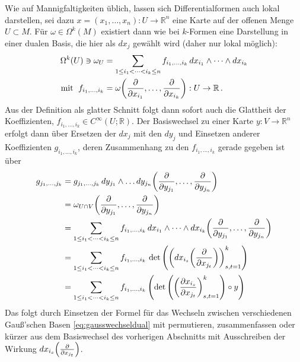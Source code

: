\documentclass[../H_Analysis_main.tex]{subfiles}
\begin{document}


Wie auf Mannigfaltigkeiten üblich, lassen sich Differentialformen auch lokal darstellen, sei dazu $x = (x_1, \dots, x_n): U \rightarrow \mathbb{R}^n$ eine Karte auf der offenen Menge $U \subset M$. Für $\omega \in \Omega^k(M)$ existiert dann wie bei $k$-Formen eine Darstellung in einer dualen Basis, die hier als $dx_j$ gewählt wird (daher nur lokal möglich):
\begin{equation}
\begin{split}
\Omega^k(U) \ni \omega_U &= \sum_{1 \leq i_1 < \dots < i_k \leq n} f_{i_1, \dots, i_k} \, dx_{i_1} \wedge \dots \wedge dx_{i_k}
\\
\text{mit } \; f_{i_1, \dots, i_k} &= \omega\qty(\pdv{x_{i_1}}, \dots, \pdv{x_{i_k}}): U \rightarrow \mathbb{R} \, .
\end{split}
\end{equation}
Aus der Definition als glatter Schnitt folgt dann sofort auch die Glattheit der Koeffizienten, $f_{i_1, \dots, i_k} \in C^\infty(U; \mathbb{R})$. Der Basiswechsel zu einer Karte $y: V \rightarrow \mathbb{R}^n$ erfolgt dann über Ersetzen der $dx_j$ mit den $dy_j$ und Einsetzen anderer Koeffizienten $g_{i_1, \dots, i_k}$, deren Zusammenhang zu den $f_{i_1, \dots, i_k}$ gerade gegeben ist über
\begin{align}
g_{j_1, \dots, j_k} &= g_{j_1, \dots, j_k} \, dy_{j_1} \wedge \dots dy_{j_n}\qty(\pdv{y_{j_1}}, \dots, \pdv{y_{j_n}})
\notag\\
&= \omega_{U \cap V} \qty(\pdv{y_{j_1}}, \dots, \pdv{y_{j_n}})
\notag\\
&= \sum_{1 \leq i_1 < \dots < i_k \leq n} f_{i_1, \dots, i_k} \, dx_{i_1} \wedge \dots \wedge dx_{i_k}\qty(\pdv{y_{j_1}}, \dots, \pdv{y_{j_n}})
\notag\\
&= \sum_{1 \leq i_1 < \dots < i_k \leq n} f_{i_1, \dots, i_k} \, \det\qty(\qty(dx_{i_s}\qty(\pdv{x_{j_t}}))_{s, t = 1}^k)
\notag\\
&= \sum_{1 \leq i_1 < \dots < i_k \leq n} f_{i_1, \dots, i_k} \, \qty(\det\qty(\qty(\pdv{x_{i_s}}{x_{j_t}})_{s, t = 1}^k) \circ y)
\end{align} 
Das folgt durch Einsetzen der Formel für das Wechseln zwischen verschiedenen Gauß'schen Basen \eqref{eq:gausswechseldual} mit permutieren, zusammenfassen oder kürzer aus dem Basiswechsel des vorherigen Abschnitts mit Ausschreiben der Wirkung $dx_{i_s}\qty(\pdv{x_{j_t}})$.
\end{document}
